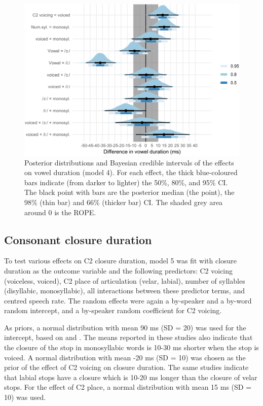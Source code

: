 \documentclass[
  12pt,
  a4paper,
]{article}
\begin{document}
\begin{figure}
\includegraphics[width=\linewidth]{2019-english-rr_files/figure-latex/vow-4-intervals-1} \caption{Posterior distributions and Bayesian credible intervals of the effects on vowel duration (model 4). For each effect, the thick blue-coloured bars indicate (from darker to lighter) the 50\%, 80\%, and 95\% CI. The black point with bars are the posterior median (the point), the 98\% (thin bar) and 66\% (thicker bar) CI. The shaded grey area around 0 is the ROPE.}\label{f:vow-4-intervals}
\end{figure}

\hypertarget{consonant-closure-duration}{%
\subsection{Consonant closure
duration}\label{consonant-closure-duration}}

\label{s:clos}

To test various effects on C2 closure duration, model 5 was fit with
closure duration as the outcome variable and the following predictors:
C2 voicing (voiceless, voiced), C2 place of articulation (velar,
labial), number of syllables (disyllabic, monosyllabic), all
interactions between these predictor terms, and centred speech rate. The
random effects were again a by-speaker and a by-word random intercept,
and a by-speaker random coefficient for C2 voicing.

As priors, a normal distribution with mean 90 ms (SD = 20) was used for
the intercept, based on \citet{sharf1962} and \citet{luce1985}. The
means reported in these studies also indicate that the closure of the
stop in monosyllabic words is 10-30 ms shorter when the stop is voiced.
A normal distribution with mean -20 ms (SD = 10) was chosen as the prior
of the effect of C2 voicing on closure duration. The same studies
indicate that labial stops have a closure which is 10-20 ms longer than
the closure of velar stops. For the effect of C2 place, a normal
distribution with mean 15 ms (SD = 10) was used.
\end{document}
